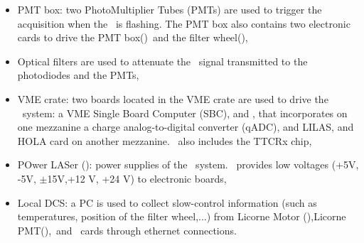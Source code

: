 \begin{itemize}
\item PMT box: two PhotoMultiplier Tubes (PMTs) are used to trigger the acquisition when the \laser~is flashing. The PMT box also contains two electronic cards to drive the PMT box(\licpmt)~and the filter wheel(\licmot),

\item Optical filters are used to attenuate the \laser~signal transmitted to the photodiodes and the PMTs,

\item VME crate: two boards located in the VME crate are used to drive the \lasii~system: a VME Single Board Computer (SBC), and \lascar, that incorporates on one mezzanine a charge analog-to-digital converter (qADC), and LILAS, and HOLA card on another mezzanine. \lascar~also includes the TTCRx chip,

\item POwer LASer (\polas): power supplies of the \lasii~system. \polas~provides low voltages (+5V, -5V, $\pm$15V,+12 V, +24 V) to electronic boards,

\item Local DCS: a PC is used to collect slow-control information (such as temperatures, position of the filter wheel,...) from Licorne Motor (\licmot),Licorne PMT(\licpmt),\licphd~and \lascar~cards through ethernet connections.


\end{itemize}